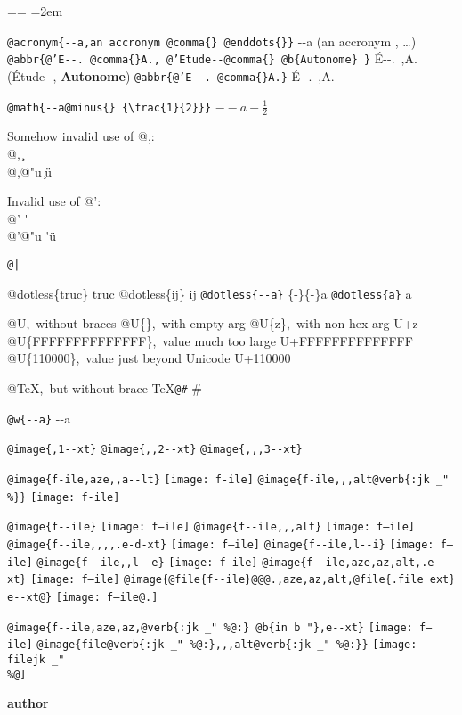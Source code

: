 \documentclass{book}
\makeatletter
\newenvironment{GNUTexinfopreformatted}{%
  \par\obeylines\obeyspaces\frenchspacing
  \parskip=\z@\parindent=\z@}{}
\renewcommand{\includegraphics}[1]{\fbox{FIG \detokenize{#1}}}
\makeatother
\begin{document}
\begin{GNUTexinfopreformatted}
\leftskip=2em\relax\ttfamily%


\texttt{@acronym\{{-}{-}a,an accronym @comma\{\} @enddots\{\}\}} {-}{-}a (an accronym , \dots{})
\texttt{@abbr\{@'E{-}{-}.\ @comma\{\}A.,\ @'Etude{-}{-}@comma\{\} @b\{Autonome\} \}} \'{E}{-}{-}.\@\ ,A.\@ (\'{E}tude{-}{-}, \textbf{Autonome})
\texttt{@abbr\{@'E{-}{-}.\ @comma\{\}A.\}} \'{E}{-}{-}.\@\ ,A.\@

\texttt{@math\{{-}{-}a@minus\{\} \{\textbackslash{}frac\{1\}\{2\}\}\}} $--a- {\frac{1}{2}}$




Somehow invalid use of @,:\leavevmode{}\\
@,\ \c{}
\leavevmode{}\\
@,@"u \c{}\"{u}

Invalid use of @':\leavevmode{}\\
@' \'{}
\leavevmode{}\\
@'@"u \'{}\"{u}

\texttt{@|} 

@dotless\{truc\} truc
@dotless\{ij\} ij
\texttt{@dotless\{{-}{-}a\}} \{-\}\{-\}a
\texttt{@dotless\{a\}} a

@U,\ without braces @U\{\},\ with empty arg 
@U\{z\},\ with non-hex arg U+z
@U\{FFFFFFFFFFFFFF\},\ value much too large U+FFFFFFFFFFFFFF
@U\{110000\},\ value just beyond Unicode U+110000

@TeX,\ but without brace \TeX{}\texttt{@\#} \#

\texttt{@w\{{-}{-}a\}} \hbox{{-}{-}a}

\texttt{@image\{,1{-}{-}xt\}} 
\texttt{@image\{{,}{,}2{-}{-}xt\}} 
\texttt{@image\{{,}{,},3{-}{-}xt\}} 

\texttt{@image\{f-ile,aze{,}{,}a{-}{-}lt\}} \texttt{[image: f-ile]}
\texttt{@image\{f-ile{,}{,},alt@verb\{:jk \_" \%\@\}\}} \texttt{[image: f-ile]}

\texttt{@image\{f{-}{-}ile\}} \texttt{[image: f--ile]}
\texttt{@image\{f{-}{-}ile{,}{,},alt\}} \texttt{[image: f--ile]}
\texttt{@image\{f{-}{-}ile{,}{,}{,}{,}.e-d-xt\}} \texttt{[image: f--ile]}
\texttt{@image\{f{-}{-}ile,l{-}{-}i\}} \texttt{[image: f--ile]}
\texttt{@image\{f{-}{-}ile{,}{,}l{-}{-}e\}} \texttt{[image: f--ile]}
\texttt{@image\{f{-}{-}ile,aze,az,alt,.e{-}{-}xt\}} \texttt{[image: f--ile]}
\texttt{@image\{@file\{f{-}{-}ile\}@@@.,aze,az,alt,@file\{.file ext\} e{-}{-}xt@\}} \texttt{[image: f--ile@.]}

\texttt{@image\{f{-}{-}ile,aze,az,@verb\{:jk \_" \%@:\} @b\{in b "\},e{-}{-}xt\}} \texttt{[image: f--ile]}
\texttt{@image\{file@verb\{:jk \_" \%@:\}{,}{,},alt@verb\{:jk \_" \%@:\}\}} \texttt{[image: filejk \_" \\\%@]}


{\bfseries author}%

\end{GNUTexinfopreformatted}
\end{document}
